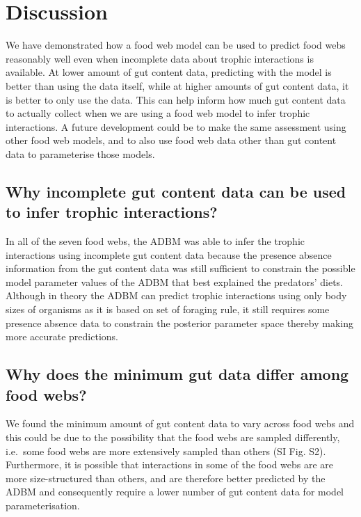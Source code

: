 \documentclass{article}
\begin{document}
\hypertarget{discussion}{%
\section{Discussion}\label{discussion}}

We have demonstrated how a food web model can be used to predict food
webs reasonably well even when incomplete data about trophic
interactions is available. At lower amount of gut content data,
predicting with the model is better than using the data itself, while at
higher amounts of gut content data, it is better to only use the data.
This can help inform how much gut content data to actually collect when
we are using a food web model to infer trophic interactions. A future
development could be to make the same assessment using other food web
models, and to also use food web data other than gut content data to
parameterise those models.

\hypertarget{why-incomplete-gut-content-data-can-be-used-to-infer-trophic-interactions}{%
\subsection{Why incomplete gut content data can be used to infer trophic
interactions?}\label{why-incomplete-gut-content-data-can-be-used-to-infer-trophic-interactions}}

In all of the seven food webs, the ADBM was able to infer the trophic
interactions using incomplete gut content data because the presence
absence information from the gut content data was still sufficient to
constrain the possible model parameter values of the ADBM that best
explained the predators' diets. Although in theory the ADBM can predict
trophic interactions using only body sizes of organisms as it is based
on set of foraging rule, it still requires some presence absence data to
constrain the posterior parameter space thereby making more accurate
predictions.

\hypertarget{why-does-the-minimum-gut-data-differ-among-food-webs}{%
\subsection{Why does the minimum gut data differ among food
webs?}\label{why-does-the-minimum-gut-data-differ-among-food-webs}}

We found the minimum amount of gut content data to vary across food webs
and this could be due to the possibility that the food webs are sampled
differently, i.e.~some food webs are more extensively sampled than
others (SI Fig. S2). Furthermore, it is possible that interactions in
some of the food webs are are more size-structured than others, and are
therefore better predicted by the ADBM and consequently require a lower
number of gut content data for model parameterisation.
\end{document}
